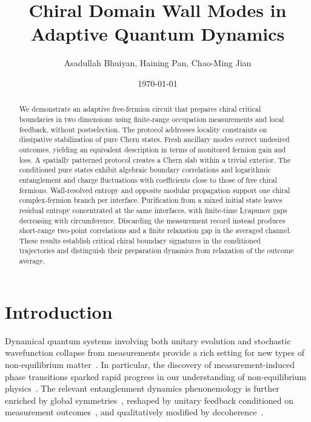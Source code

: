 \documentclass[aps,prb,10pt,twocolumn,superscriptaddress,longbibliography,floatfix]{revtex4-2}
\newcommand{\newtext}[1]{{\color{blue}#1}}
\begin{document}
\raggedbottom

\title{Chiral Domain Wall Modes in Adaptive Quantum Dynamics}
\author{Asadullah Bhuiyan, Haining Pan, Chao-Ming Jian}
\noaffiliation
\date{\today}

\begin{abstract}
\newtext{We demonstrate an adaptive free-fermion circuit that prepares chiral critical boundaries in two dimensions using finite-range occupation measurements and local feedback, without postselection. The protocol addresses locality constraints on dissipative stabilization of pure Chern states. Fresh ancillary modes correct undesired outcomes, yielding an equivalent description in terms of monitored fermion gain and loss. A spatially patterned protocol creates a Chern slab within a trivial exterior. The conditioned pure states exhibit algebraic boundary correlations and logarithmic entanglement and charge fluctuations with coefficients close to those of free chiral fermions. Wall-resolved entropy and opposite modular propagation support one chiral complex-fermion branch per interface. Purification from a mixed initial state leaves residual entropy concentrated at the same interfaces, with finite-time Lyapunov gaps decreasing with circumference. Discarding the measurement record instead produces short-range two-point correlations and a finite relaxation gap in the averaged channel. These results establish critical chiral boundary signatures in the conditioned trajectories and distinguish their preparation dynamics from relaxation of the outcome average.}
\end{abstract}

\maketitle

\setcounter{tocdepth}{2}
\tableofcontents


\section{Introduction}

Dynamical quantum systems involving both unitary evolution and stochastic wavefunction collapse from measurements provide a rich setting for new types of non-equilibrium matter~\cite{PotterVasseur2022,FisherKhemaniNahumVijay2023}.
In particular, the discovery of measurement-induced phase
transitions sparked rapid progress in our understanding of non-equilibrium physics~\cite{LiChenFisher2018,SkinnerRuhmanNahum2019,ChanNandkishorePretkoSmith2019,LiChenFisher2019,GullansHuse2020}. The relevant entanglenment dynamics phenonemology is further enriched by global symmetries~\cite{SangHsieh2021,BaoChoiAltman2021,LavasaniAlaviradBarkeshli2021,AgrawalEtAl2022,MajidyEtAl2023}, reshaped by unitary feedback conditioned on measurement outcomes~\cite{IadecolaEtAl2023,RavindranathEtAl2023,PiroliEtAl2023,SierantTurkeshi2023,ODeaEtAl2024}, and qualitatively modified by decoherence~\cite{WeinsteinBaoAltman2022,LiClaassen2023,LiSangHsieh2023,LiuLiZhangJian2024,IvakiOjanenMoghaddam2025}.
\end{document}
